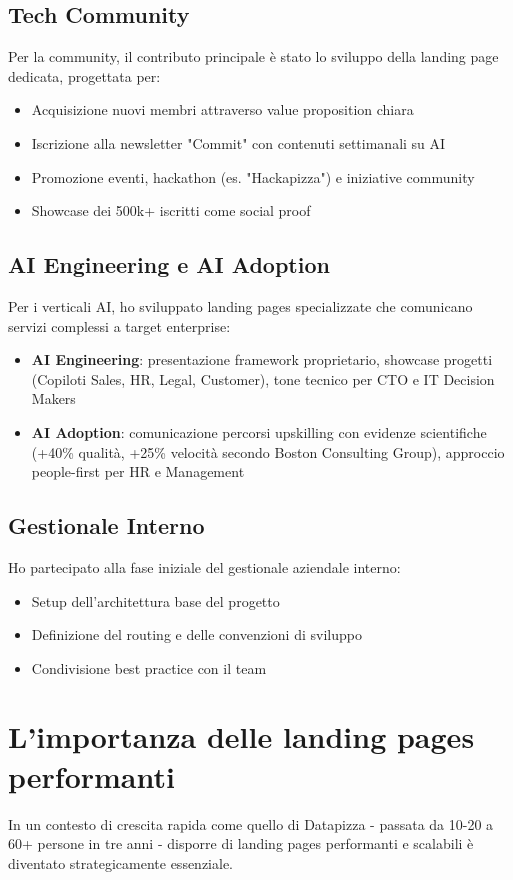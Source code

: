 \subsection{Tech Community}
Per la community, il contributo principale è stato lo sviluppo della landing page dedicata, progettata per:
\begin{itemize}
  \item Acquisizione nuovi membri attraverso value proposition chiara
  \item Iscrizione alla newsletter "Commit" con contenuti settimanali su AI
  \item Promozione eventi, hackathon (es. "Hackapizza") e iniziative community
  \item Showcase dei 500k+ iscritti come social proof
\end{itemize}

\subsection{AI Engineering e AI Adoption}
Per i verticali AI, ho sviluppato landing pages specializzate che comunicano servizi complessi a target enterprise:
\begin{itemize}
  \item \textbf{AI Engineering}: presentazione framework proprietario, showcase progetti (Copiloti Sales, HR, Legal, Customer), tone tecnico per CTO e IT Decision Makers
  \item \textbf{AI Adoption}: comunicazione percorsi upskilling con evidenze scientifiche (+40\% qualità, +25\% velocità secondo Boston Consulting Group), approccio people-first per HR e Management
\end{itemize}

\subsection{Gestionale Interno}
Ho partecipato alla fase iniziale del gestionale aziendale interno:
\begin{itemize}
  \item Setup dell'architettura base del progetto
  \item Definizione del routing e delle convenzioni di sviluppo
  \item Condivisione best practice con il team
\end{itemize}

\section{L'importanza delle landing pages performanti}
In un contesto di crescita rapida come quello di Datapizza - passata da 10-20 a 60+ persone in tre anni - disporre di landing pages performanti e scalabili è diventato strategicamente essenziale.

